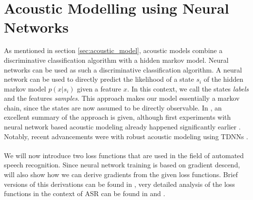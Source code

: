 \section{Acoustic Modelling using Neural Networks}

As mentioned in section \ref{sec:acoustic_model}, acoustic models combine a discriminative classification algorithm with a hidden markov model. Neural networks can be used as such a discriminative classification algorithm. A neural network can be used to directly predict the likelihood of a state $s_i$ of the hidden markov model $p(x|s_i)$ given a feature $x$. In this context, we call the states \textit{labels} and the features \textit{samples}. This approach makes our model essentially a markov chain, since the states are now assumed to be directly observable. In \cite{hinton2012deep}, an excellent summary of the approach is given, although first experiments with neural network based acoustic modeling already happened significantly earlier \cite{bengio1993connectionist}. Notably, recent advancements were with robust acoustic modeling using TDNNs \cite{peddinti2015jhu}. \\ \\
We will now introduce two loss functions that are used in the field of automated speech recognition. Since neural network training is based on gradient descend, will also show how we can derive gradients from the given loss functions. Brief versions of this derivations can be found in \cite{ghoshal2013sequence}, very detailed analysis of the loss functions in the context of ASR can be found in \cite{gibson2008minimum} and \cite{povey2005discriminative}.

